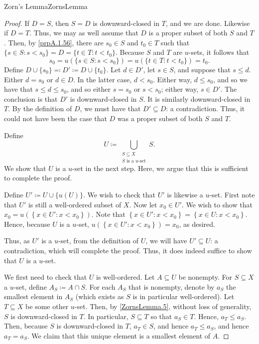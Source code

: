 \begin{thm}{Zorn's Lemma}{ZornsLemma}
\begin{proof}
If $D=S$, then $S=D$ is downward-closed in $T$, and we are done.  Likewise if $D=T$.  Thus, we may as well assume that $D$ is a proper subset of both $S$ and $T$.  Then, by \cref{prpA.1.56}, there are $s_0\in S$ and $t_0\in T$ such that $\{ s\in S:s<s_0\} =D=\{ t\in T:t<t_0\}$.  Because $S$ and $T$ are $u$-sets, it follows that
\begin{equation*}
s_0=u\left( \{ s\in S:s<s_0\} \right) =u\left( \{ t\in T:t<t_0\} \right) =t_0.
\end{equation*}
Define $D\cup \{ s_0\} \eqqcolon D'\coloneqq D\cup \{ t_0\}$.
Let $d\in D'$, let $s\in S$, and suppose that $s\leq d$.  Either $d=s_0$ or $d\in D$.  In the latter case, $d<s_0$.  Either way, $d\leq s_0$, and so we have that $s\leq d\leq s_0$, and so either $s=s_0$ or $s<s_0$; either way, $s\in D'$.  The conclusion is that $D'$ is downward-closed in $S$.  It is similarly downward-closed in $T$.  By the definition of $D$, we must have that $D'\subseteq D$:  a contradiction.  Thus, it could not have been the case that $D$ was a proper subset of both $S$ and $T$.

Define
\begin{equation}
U\coloneqq \bigcup _{\substack{S\subseteq X \\ S\text{ is a }u\text{-set}}}S.
\end{equation}
We show that $U$ is a $u$-set in the next step.  Here, we argue that this is sufficient to complete the proof.

Define $U'\coloneqq U\cup \{ u(U)\}$.  We wish to check that $U'$ is likewise a $u$-set.  First note that $U'$ is still a well-ordered subset of $X$.  Now let $x_0\in U'$.  We wish to show that $x_0=u\left( \left\{ x\in U':x<x_0\right\} \right)$.  Note that $\left\{ x\in U':x<x_0\right\} =\left\{ x\in U:x<x_0\right\}$.  Hence, because $U$ is a $u$-set, $u\left( \left\{ x\in U':x<x_0\right\} \right) =x_0$, as desired.

Thus, as $U'$ is a $u$-set, from the definition of $U$, we will have $U'\subseteq U$:  a contradiction, which will complete the proof.  Thus, it does indeed suffice to show that $U$ is a $u$-set.

We first need to check that $U$ is well-ordered.  Let $A\subseteq U$ be nonempty.  For $S\subseteq X$ a $u$-set, define $A_S\coloneqq A\cap S$.  For each $A_S$ that is nonempty, denote by $a_S$ the smallest element in $A_S$ (which exists as $S$ is in particular well-ordered).  Let $T\subseteq X$ be some other $u$-set.  Then, by \cref{ZornsLemma.5}, without loss of generality, $S$ is downward-closed in $T$.  In particular, $S\subseteq T$ so that $a_S\in T$.  Hence, $a_T\leq a_S$.  Then, because $S$ is downward-closed in $T$, $a_T\in S$, and hence $a_T\leq a_S$, and hence $a_T=a_S$.  We claim that this unique element is a smallest element of $A$.


\end{proof}
\end{thm}

